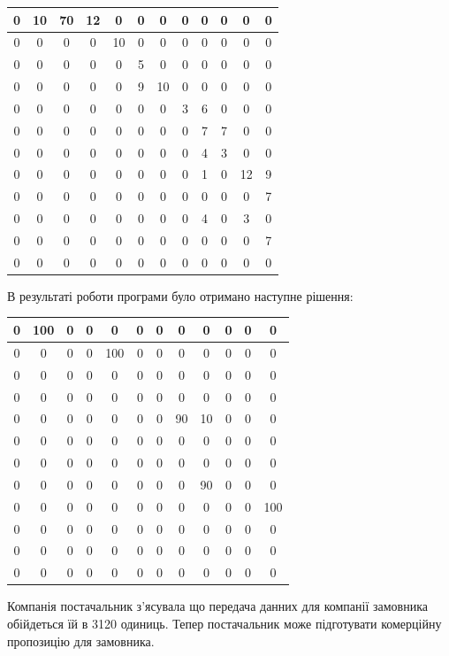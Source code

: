 \documentclass[a4paper,14pt,russian,ukrainian,oneside,final]{extreport}
\begin{document}
\begin{center}
\begin{tabular}{|c|c|c|c|c|c|c|c|c|c|c|c|}
\hline
0&10&70&12&0&0&0&0&0&0&0&0\\ \hline
0&0&0&0&10&0&0&0&0&0&0&0  \\ \hline
0&0&0&0&0&5&0&0&0&0&0&0   \\ \hline
0&0&0&0&0&9&10&0&0&0&0&0  \\ \hline
0&0&0&0&0&0&0&3&6&0&0&0   \\ \hline
0&0&0&0&0&0&0&0&7&7&0&0   \\ \hline
0&0&0&0&0&0&0&0&4&3&0&0   \\ \hline
0&0&0&0&0&0&0&0&1&0&12&9  \\ \hline
0&0&0&0&0&0&0&0&0&0&0&7   \\ \hline
0&0&0&0&0&0&0&0&4&0&3&0   \\ \hline
0&0&0&0&0&0&0&0&0&0&0&7   \\ \hline
0&0&0&0&0&0&0&0&0&0&0&0   \\ \hline
\end{tabular}
\end{center}

\indent В результаті роботи програми було отримано наступне рішення:
\begin{center}
\begin{tabular}{|c|c|c|c|c|c|c|c|c|c|c|c|}
\hline
0&100&0&0&0&0&0&0&0&0&0&0 \\ \hline
0&0&0&0&100&0&0&0&0&0&0&0 \\ \hline
0&0&0&0&0&0&0&0&0&0&0&0   \\ \hline
0&0&0&0&0&0&0&0&0&0&0&0   \\ \hline
0&0&0&0&0&0&0&90&10&0&0&0 \\ \hline
0&0&0&0&0&0&0&0&0&0&0&0   \\ \hline
0&0&0&0&0&0&0&0&0&0&0&0   \\ \hline
0&0&0&0&0&0&0&0&90&0&0&0  \\ \hline
0&0&0&0&0&0&0&0&0&0&0&100 \\ \hline
0&0&0&0&0&0&0&0&0&0&0&0   \\ \hline
0&0&0&0&0&0&0&0&0&0&0&0   \\ \hline
0&0&0&0&0&0&0&0&0&0&0&0   \\ \hline
\end{tabular}
\end{center}
Компанія постачальник з'ясувала що передача данних для компанії замовника обійдеться їй в 3120 одиниць.
Тепер постачальник може підготувати комерційну пропозицію для замовника.
\end{document}
